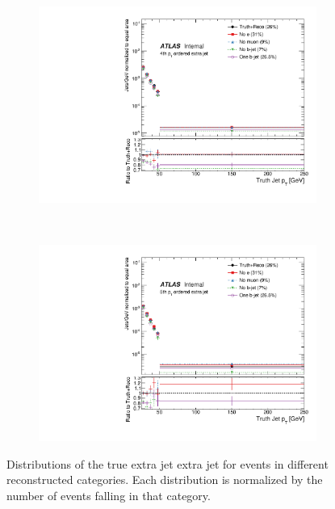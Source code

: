 \begin{figure}
\begin{subfigure}[]{0.33\textwidth}
\end{subfigure}
~
\begin{subfigure}[]{0.33\textwidth}
\includegraphics[width=\textwidth]{fig/TruthNotReco/TruthPtJet3.pdf}
\end{subfigure}
~
\\
\begin{subfigure}[]{0.33\textwidth}
\includegraphics[width=\textwidth]{fig/TruthNotReco/TruthPtJet4.pdf}
\end{subfigure}

\caption{Distributions of the true extra jet extra jet \pt for events in different reconstructed categories. Each distribution is normalized by the number of events falling in that category. }
\label{fig:norecojetpt}
\end{figure}

